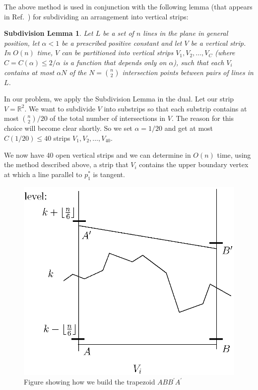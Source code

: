 \documentclass{elsart}
\newtheorem{thma}{Subdivision Lemma}
\begin{document}
The above method is used in conjunction with the following lemma
(that appears in Ref.~\cite{algorithms_for_ham_sandwich_cuts}) for
subdividing an arrangement into vertical strips:

\begin{thma}
Let $L$ be a set of $n$ lines in the plane in general position, let
$\alpha < 1$ be a prescribed positive constant and let $V$ be a
vertical strip. In $O(n)$ time, $V$ can be partitioned into vertical
strips $V_1, V_2, \ldots, V_C$ (where $C = C(\alpha)\le 2/\alpha$ is a function
that depends only on $\alpha$), such that each $V_i$ contains at most
$\alpha N$ of the $N = {n \choose 2}$ intersection points between
pairs of lines in
$L$. 
\end{thma}

In our problem, we apply the Subdivision Lemma in the dual. Let our
strip $V=\mathbb{R}^2$.  We want to subdivide $V$ into substrips so
that each substrip contains at most ${n\choose 2}/20$ of the
total number of intersections in $V$. The reason for this choice will
become clear shortly. So we set $\alpha = {1}/{20}$ and get at
most $C(1/20)\le 40$ strips $V_1, V_2, \ldots, V_{40}$.

We now have 40 open vertical strips and we can determine in $O(n)$
time, using the method described above, a strip that $V_i$ contains
the upper boundary vertex at which a line parallel to $p_1^*$ is
tangent. 

\begin{figure}
 \begin{center}
   \includegraphics{fig6}
   \caption{\label{fig_trapezoid}Figure showing how we build the trapezoid $ABB^{\prime}A^{\prime}$}
 \end{center}
\end{figure}
\end{document}
